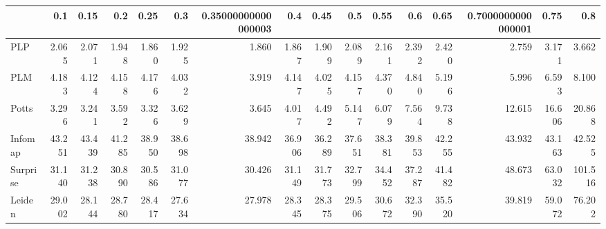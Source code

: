 \begin{tabular}{lrrrrrrrrrrrrrrr}
\toprule
{} &    0.1 &   0.15 &    0.2 &   0.25 &    0.3 & 0.35000000000000003 &    0.4 &   0.45 &    0.5 &   0.55 &    0.6 &   0.65 & 0.7000000000000001 &   0.75 &     0.8 \\
\midrule
PLP      &  2.065 &  2.071 &  1.948 &  1.860 &  1.925 &               1.860 &  1.867 &  1.909 &  2.089 &  2.161 &  2.392 &  2.420 &              2.759 &  3.171 &   3.662 \\
PLM      &  4.183 &  4.124 &  4.158 &  4.176 &  4.032 &               3.919 &  4.147 &  4.025 &  4.157 &  4.370 &  4.840 &  5.196 &              5.996 &  6.593 &   8.100 \\
Potts    &  3.296 &  3.241 &  3.592 &  3.326 &  3.629 &               3.645 &  4.017 &  4.492 &  5.147 &  6.079 &  7.564 &  9.738 &             12.615 & 16.606 &  20.868 \\
Infomap  & 43.251 & 43.439 & 41.285 & 38.950 & 38.698 &              38.942 & 36.906 & 36.289 & 37.651 & 38.381 & 39.853 & 42.255 &             43.932 & 43.163 &  42.525 \\
Surprise & 31.140 & 31.238 & 30.890 & 30.586 & 31.077 &              30.426 & 31.149 & 31.773 & 32.799 & 34.452 & 37.287 & 41.482 &             48.673 & 63.032 & 101.516 \\
Leiden   & 29.002 & 28.144 & 28.780 & 28.417 & 27.634 &              27.978 & 28.345 & 28.375 & 29.506 & 30.672 & 32.390 & 35.520 &             39.819 & 59.072 &  76.202 \\
\bottomrule
\end{tabular}
